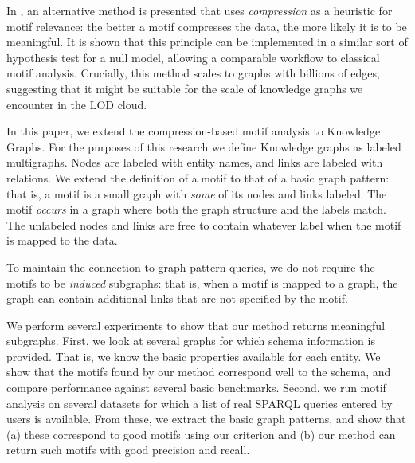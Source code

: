 \documentclass[11pt]{article}
\begin{document}

In \cite{bloem2017large}, an alternative method is presented that uses \emph{compression} as a heuristic for motif relevance: the better a motif compresses the data, the more likely it is to be meaningful. It is shown that this principle can be implemented in a similar sort of hypothesis test for a null model, allowing a comparable workflow to classical motif analysis. Crucially, this method scales to graphs with billions of edges, suggesting that it might be suitable for the scale of knowledge graphs we encounter in the LOD cloud.

In this paper, we extend the compression-based motif analysis to Knowledge Graphs. For the purposes of this research we define Knowledge graphs as labeled multigraphs. Nodes are labeled with entity names, and links are labeled with relations. We extend the definition of a motif to that of a basic graph pattern: that is, a motif is a small graph with \emph{some} of its nodes and links labeled. The motif \emph{occurs} in a graph where both the graph structure and the labels match. The unlabeled nodes and links are free to contain whatever label when the motif is mapped to the data. 

To maintain the connection to graph pattern queries, we do not require the motifs to be \emph{induced} subgraphs: that is, when a motif is mapped to a graph, the graph can contain additional links that are not specified by the motif. 

We perform several experiments to show that our method returns meaningful subgraphs. First, we look at several graphs for which schema information is provided. That is, we know the basic properties available for each entity. We show that the motifs found by our method correspond well to the schema, and compare performance against several basic benchmarks. Second, we run motif analysis on several datasets for which a list of real SPARQL queries entered by users is available. From these, we extract the basic graph patterns, and show that (a) these correspond to good motifs using our criterion and (b) our method can return such motifs with good precision and recall.
\end{document}
